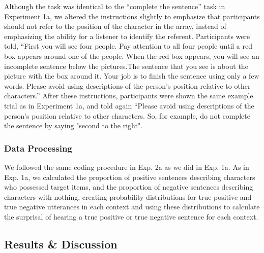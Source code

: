 \documentclass[man, floatsintext, noapacite]{apa6}
\begin{document}
Although the task was identical to the ``complete the sentence'' task in Experiment 1a, we altered the instructions slightly to emphasize that participants should not refer to the position of the character in the array, instead of emphasizing the ability for a listener to identify the referent. Participants were told, ``First you will see four people. Pay attention to all four people until a red box appears around one of the people. When the red box appears, you will see an incomplete sentence below the pictures.The sentence that you see is about the picture with the box around it. Your job is to finish the sentence using only a few words. Please avoid using descriptions of the person's position relative to other characters.'' After these instructions, participants were shown the same example trial as in Experiment 1a, and told again ``Please avoid using descriptions of the person's position relative to other characters. So, for example, do not complete the sentence by saying "second to the right".

\subsubsection{Data Processing} 

We followed the same coding procedure in Exp. 2a as we did in Exp. 1a. As in Exp. 1a, we calculated the proportion of positive sentences describing characters who possessed target items, and the proportion of negative sentences describing characters with nothing, creating probability distributions for true positive and true negative utterances in each context and using these distributions to calculate the surprisal of hearing a true positive or true negative sentence for each context. 


\subsection{Results \& Discussion}
\end{document}
